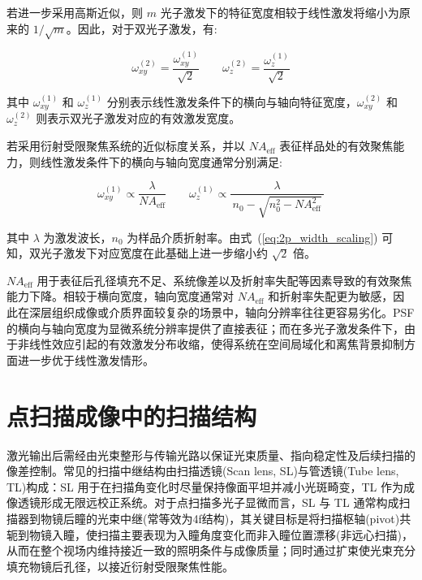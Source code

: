 若进一步采用高斯近似，则 $m$ 光子激发下的特征宽度相较于线性激发将缩小为原来的 $1/\sqrt m$。因此，对于双光子激发，有:

\begin{equation}
  \omega_{xy}^{(2)}=\frac{\omega_{xy}^{(1)}}{\sqrt2} \qquad
  \omega_{z}^{(2)}=\frac{\omega_{z}^{(1)}}{\sqrt2}
  \label{eq:2p_width_scaling}
\end{equation}

其中 $\omega_{xy}^{(1)}$ 和 $\omega_{z}^{(1)}$ 分别表示线性激发条件下的横向与轴向特征宽度，$\omega_{xy}^{(2)}$ 和 $\omega_{z}^{(2)}$ 则表示双光子激发对应的有效激发宽度。

若采用衍射受限聚焦系统的近似标度关系，并以 $NA_{\mathrm{eff}}$ 表征样品处的有效聚焦能力，则线性激发条件下的横向与轴向宽度通常分别满足:

\begin{equation}
  \omega_{xy}^{(1)} \propto \frac{\lambda}{NA_{\mathrm{eff}}}
  \qquad
  \omega_{z}^{(1)} \propto \frac{\lambda}{\,n_0-\sqrt{n_0^2-NA_{\mathrm{eff}}^2}\,}
  \label{eq:linear_width_scaling}
\end{equation}

其中 $\lambda$ 为激发波长，$n_0$ 为样品介质折射率。由式~(\ref{eq:2p_width_scaling}) 可知，双光子激发下对应宽度在此基础上进一步缩小约 $\sqrt2$ 倍。

$NA_{\mathrm{eff}}$ 用于表征后孔径填充不足、系统像差以及折射率失配等因素导致的有效聚焦能力下降。相较于横向宽度，轴向宽度通常对 $NA_{\mathrm{eff}}$ 和折射率失配更为敏感，因此在深层组织成像或介质界面较复杂的场景中，轴向分辨率往往更容易劣化。PSF 的横向与轴向宽度为显微系统分辨率提供了直接表征；而在多光子激发条件下，由于非线性效应引起的有效激发分布收缩，使得系统在空间局域化和离焦背景抑制方面进一步优于线性激发情形。



\section{点扫描成像中的扫描结构}\label{2.3}
激光输出后需经由光束整形与传输光路以保证光束质量、指向稳定性及后续扫描的像差控制。常见的扫描中继结构由扫描透镜(Scan lens, SL)与管透镜(Tube lens, TL)构成：SL 用于在扫描角变化时尽量保持像面平坦并减小光斑畸变，TL 作为成像透镜形成无限远校正系统。对于点扫描多光子显微而言，SL 与 TL 通常构成扫描器到物镜后瞳的光束中继(常等效为4f结构)，其关键目标是将扫描枢轴(pivot)共轭到物镜入瞳，使扫描主要表现为入瞳角度变化而非入瞳位置漂移(非远心扫描)，从而在整个视场内维持接近一致的照明条件与成像质量；同时通过扩束使光束充分填充物镜后孔径，以接近衍射受限聚焦性能。



